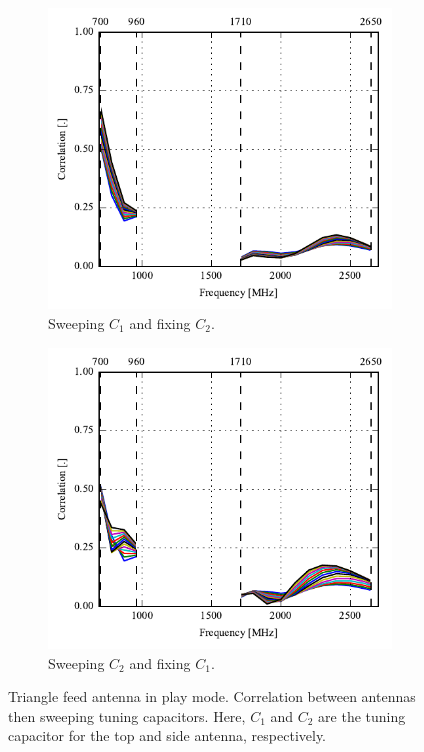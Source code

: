 \begin{figure}[htbp]
    \centering
    \begin{subfigure}{0.49\linewidth}
        \includegraphics{img/tech_sol/trianglefeed/play_mode/correlation_Csh1-sweep}
        \caption{Sweeping $C_1$ and fixing $C_2$.}
    \end{subfigure}
    \hfill
    \begin{subfigure}{0.49\linewidth}
        \includegraphics{img/tech_sol/trianglefeed/play_mode/correlation_Csh2-sweep}
        \caption{Sweeping $C_2$ and fixing $C_1$.}
    \end{subfigure}
    \caption{Triangle feed antenna in play mode. Correlation between antennas then sweeping tuning capacitors. Here, $C_1$ and $C_2$ are the tuning capacitor for the top and side antenna, respectively.}
    \label{fig:corr_sol2_play}
\end{figure}

